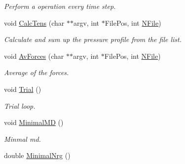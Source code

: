 \begin{DoxyCompactItemize}
\begin{DoxyCompactList}\small\item\em \-Perform a operation every time step. \end{DoxyCompactList}\item 
\hypertarget{classForces_aac83d4bd108ccaa2c52289f05ea0d009}{void \hyperlink{classForces_aac83d4bd108ccaa2c52289f05ea0d009}{\-Calc\-Tens} (char $\ast$$\ast$argv, int $\ast$\-File\-Pos, int \hyperlink{classForces_afc36f5ebb0ee5c1be5fc2161e1fa3959}{\-N\-File})}\label{classForces_aac83d4bd108ccaa2c52289f05ea0d009}

\begin{DoxyCompactList}\small\item\em \-Calculate and sum up the pressure profile from the file list. \end{DoxyCompactList}\item 
\hypertarget{classForces_acf39045486a7e38d437f191e2a845d83}{void \hyperlink{classForces_acf39045486a7e38d437f191e2a845d83}{\-Av\-Forces} (char $\ast$$\ast$argv, int $\ast$\-File\-Pos, int \hyperlink{classForces_afc36f5ebb0ee5c1be5fc2161e1fa3959}{\-N\-File})}\label{classForces_acf39045486a7e38d437f191e2a845d83}

\begin{DoxyCompactList}\small\item\em \-Average of the forces. \end{DoxyCompactList}\item 
\hypertarget{classForces_a38ef42f2e70e5ed764a0fa0d56757a57}{void \hyperlink{classForces_a38ef42f2e70e5ed764a0fa0d56757a57}{\-Trial} ()}\label{classForces_a38ef42f2e70e5ed764a0fa0d56757a57}

\begin{DoxyCompactList}\small\item\em \-Trial loop. \end{DoxyCompactList}\item 
\hypertarget{classForces_a3ee2891acdfca29fc27e89883f2a2df4}{void \hyperlink{classForces_a3ee2891acdfca29fc27e89883f2a2df4}{\-Minimal\-M\-D} ()}\label{classForces_a3ee2891acdfca29fc27e89883f2a2df4}

\begin{DoxyCompactList}\small\item\em \-Minmal md. \end{DoxyCompactList}\item 
\hypertarget{classForces_a8f18498c3494e8fe2476f90f9631c6a8}{double \hyperlink{classForces_a8f18498c3494e8fe2476f90f9631c6a8}{\-Minimal\-Nrg} ()}\label{classForces_a8f18498c3494e8fe2476f90f9631c6a8}


\end{DoxyCompactItemize}
